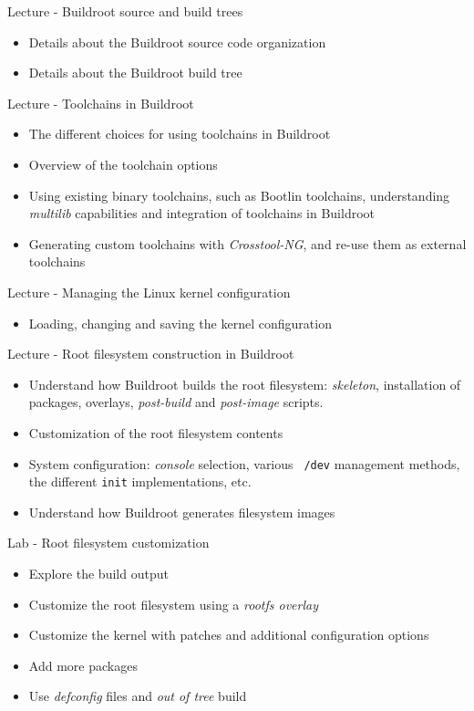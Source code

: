 \documentclass[a4paper,12pt,obeyspaces,spaces,hyphens]{article}
\begin{document}
\feagendatwocolumn
{Lecture - Buildroot source and build trees}
{
  \begin{itemize}
  \item Details about the Buildroot source code organization
  \item Details about the Buildroot build tree
  \end{itemize}
}
{Lecture - Toolchains in Buildroot}
{
  \begin{itemize}
  \item The different choices for using toolchains in Buildroot
  \item Overview of the toolchain options
  \item Using existing binary toolchains, such as Bootlin
    toolchains, understanding {\em multilib} capabilities and
    integration of toolchains in Buildroot
  \item Generating custom toolchains with {\em Crosstool-NG}, and
    re-use them as external toolchains
  \end{itemize}
}

\feagendatwocolumn
{Lecture - Managing the Linux kernel configuration}
{
  \begin{itemize}
  \item Loading, changing and saving the kernel configuration
  \end{itemize}
}
{Lecture - Root filesystem construction in Buildroot}
{
  \begin{itemize}
  \item Understand how Buildroot builds the root filesystem: {\em
      skeleton}, installation of packages, overlays, {\em post-build}
    and {\em post-image} scripts.
  \item Customization of the root filesystem contents
  \item System configuration: {\em console} selection, various {\tt
      /dev} management methods, the different {\tt init}
    implementations, etc.
  \item Understand how Buildroot generates filesystem images
  \end{itemize}
}

\feagendaonecolumn
{Lab - Root filesystem customization}
{
  \begin{itemize}
  \item Explore the build output
  \item Customize the root filesystem using a {\em rootfs overlay}
  \item Customize the kernel with patches and additional configuration
    options
  \item Add more packages
  \item Use {\em defconfig} files and {\em out of tree} build
  \end{itemize}
}
\end{document}
